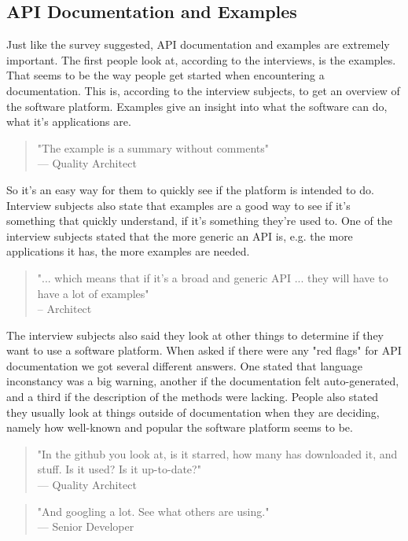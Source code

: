 \documentclass{cslthse-msc}
\begin{document}
    \subsection{API Documentation and Examples}
    Just like the survey suggested, API documentation and examples are extremely important. The first people look at, according to the interviews, is the examples. That seems to be the way people get started when encountering a documentation. This is, according to the interview subjects, to get an overview of the software platform. Examples give an insight into what the software can do, what it's applications are.
    \begin{quote}
        "The example is a summary without comments" \\
        --- Quality Architect
    \end{quote}
    So it's an easy way for them to quickly see if the platform is intended to do. Interview subjects also state that examples are a good way to see if it's something that quickly understand, if it's something they're used to. One of the interview subjects stated that the more generic an API is, e.g. the more applications it has, the more examples are needed.
    \begin{quote}
        "... which means that if it's a broad and generic API ... they will have to have a lot of examples" \\
        -- Architect
    \end{quote}
    The interview subjects also said they look at other things to determine if they want to use a software platform. When asked if there were any "red flags" for API documentation we got several different answers. One stated that language inconstancy was a big warning, another if the documentation felt auto-generated, and a third if the description of the methods were lacking. People also stated they usually look at things outside of documentation when they are deciding, namely how well-known and popular the software platform seems to be.
    \begin{quote}
        "In the github you look at, is it starred, how many has downloaded it, and stuff. Is it used? Is it up-to-date?" \\
        --- Quality Architect
    \end{quote}
    \begin{quote}
        "And googling a lot. See what others are using."\\
        --- Senior Developer \\
    \end{quote}
\end{document}
